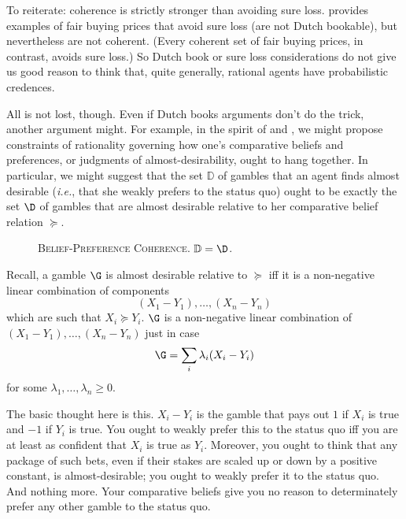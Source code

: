 To reiterate: coherence is strictly stronger than avoiding sure loss. \citet[Section 2.4]{Walley1991} provides examples of fair buying prices that avoid sure loss (are not Dutch bookable), but nevertheless are not coherent. (Every coherent set of fair buying prices, in contrast, avoids sure loss.) So Dutch book or sure loss considerations do not give us good reason to think that, quite generally, rational agents have probabilistic credences.

All is not lost, though. Even if Dutch books arguments don't do the trick, another argument might. For example, in the spirit of \citet{Icard2016} and \citet[p. 338]{Fishburn1986}, we might propose constraints of rationality governing how one's comparative beliefs and preferences, or judgments of almost-desirability, ought to hang together. In particular, we might suggest that the set $\mathbb{D}$ of gambles that an agent finds almost desirable (\textit{i.e.}, that she weakly prefers to the status quo) ought to be exactly the set $\D$ of gambles that are almost desirable relative to her comparative belief relation $\succeq$. 
\begin{description}
\item[] \textsc{Belief-Preference Coherence}. $\mathbb{D}=\D$.
\end{description}
Recall, a gamble $\G$ is almost desirable relative to $\succeq$ iff it is a non-negative linear combination of components
\[
(X_1-Y_1),\hdots,(X_n-Y_n)
\]
which are such that $X_i\succeq Y_i$. $\G$ is a non-negative linear combination of $(X_1-Y_1),\hdots,(X_n-Y_n)$ just in case
\[
\G=\sum_i \lambda_i(X_i-Y_i)
\]
for some $\lambda_1,\hdots,\lambda_n\geq0$.

The basic thought here is this. $X_i-Y_i$ is the gamble that pays out \textsterling$1$ if $X_i$ is true and $-$\textsterling$1$ if $Y_i$ is true. You ought to weakly prefer this to the status quo iff you are at least as confident that $X_i$ is true as $Y_i$. Moreover, you ought to think that any package of such bets, even if their stakes are scaled up or down by a positive constant, is almost-desirable; you ought to weakly prefer it to the status quo. And nothing more. Your comparative beliefs give you no reason to determinately prefer any other gamble to the status quo.

